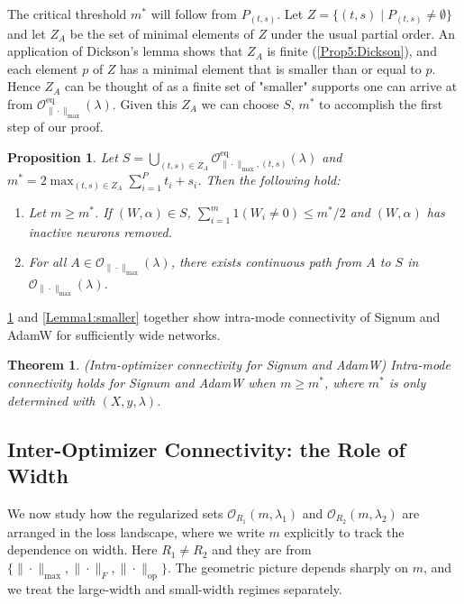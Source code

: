 \documentclass{article}
\newtheorem{theorem}{Theorem}[section]
\newtheorem{proposition}{Proposition}[section]
\newcommand{\op}{\mathrm{op}}
\newcommand{\eq}{\mathrm{eq}}      %
\begin{document}
The critical threshold $m^*$ will follow from  $P_{(t, s)}$.
Let $Z = \{ (t, s) \mid P_{(t, s)} \ne \emptyset \}$ and let $Z_A$ be the set of minimal elements of $Z$ under the usual partial order. An application of Dickson's lemma shows that $Z_A$ is finite (\cref{Prop5:Dickson}), and each element $p$ of $Z$ has a minimal element that is smaller than or equal to $p$. Hence $Z_A$ can be thought of as a finite set of "smaller" supports one can arrive at from $\mathcal{O}_{\|\cdot\|_{\max}}^{\eq}(\lambda)$. Given this $Z_A$ we can choose $S$, $m^{*}$ to accomplish the first step of our proof.
\begin{proposition}
\label{Prop6:l1reduction}
Let $S = \bigcup_{(t,s) \in Z_A} \mathcal{O}_{\|\cdot\|_{\max}, (t,s)}^{\eq}(\lambda)$ and $m^* = 2 \max_{(t,s) \in Z_A} \sum_{i=1}^P t_i + s_i$. Then the following hold:
\begin{enumerate}[left=0pt]
    \item[i)] Let $m \geq m^*$. If $(W, \alpha) \in S$, $\sum_{i=1}^m 1(W_i \neq 0) \leq m^*/2$ and $(W,\alpha)$ has inactive neurons removed.
    \item[ii)] For all $A \in \mathcal{O}_{\|\cdot\|_{\max}}(\lambda)$, there exists continuous path from $A$ to $S$ in $\mathcal{O}_{\|\cdot\|_{\max}}(\lambda)$.
\end{enumerate}
\end{proposition}
\cref{Prop6:l1reduction} and \cref{Lemma1:smaller} together show intra-mode connectivity of Signum and AdamW for sufficiently wide networks.
\begin{theorem}   
\label{t2:intra_signum_32}
(Intra-optimizer connectivity for Signum and AdamW) Intra-mode connectivity holds for Signum and AdamW when $m\geq m^{*}$, where $m^*$ is only determined with $(X, y, \lambda)$.
\end{theorem}

\subsection{Inter-Optimizer Connectivity: the Role of Width}
\label{sec:inter-mode connectivity}

We now study how the regularized sets $\mathcal{O}_{R_1}(m,\lambda_1)$ and $\mathcal{O}_{R_2}(m,\lambda_2)$ are arranged in the loss landscape, where we write $m$ explicitly to track the dependence on width. Here $R_1 \neq R_2$ and they are from $\{\|\cdot\|_{\max}, \|\cdot\|_F, \|\cdot\|_{\op}\}$. The geometric picture depends sharply on $m$, and we treat the large-width and small-width regimes separately.
\end{document}
